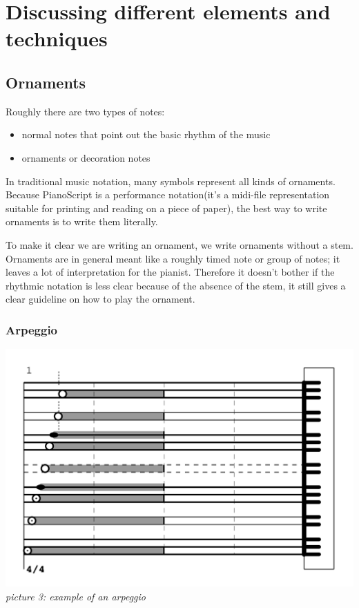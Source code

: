 \documentclass[11pt,a4paper]{article}
\begin{document}
\section{Discussing different elements and techniques}
\subsection{Ornaments}
Roughly there are two types of notes:
\begin{itemize}
\item{normal notes that point out the basic rhythm of the music}
\item{ornaments or decoration notes}
\end{itemize}

In traditional music notation, many symbols represent all kinds of ornaments. Because PianoScript is a performance notation(it's a midi-file representation suitable for printing and reading on a piece of paper), the best way to write ornaments is to write them literally. 

To make it clear we are writing an ornament, we write ornaments without a stem. Ornaments are in general meant like a roughly timed note or group of notes; it leaves a lot of interpretation for the pianist. Therefore it doesn't bother if the rhythmic notation is less clear because of the absence of the stem, it still gives a clear guideline on how to play the ornament.

\subsubsection{Arpeggio}
\begin{center}
\includegraphics[scale=.75]{images/arpeggio.jpg}\\
\emph{\small picture 3: example of an arpeggio}
\end{center}
\end{document}
